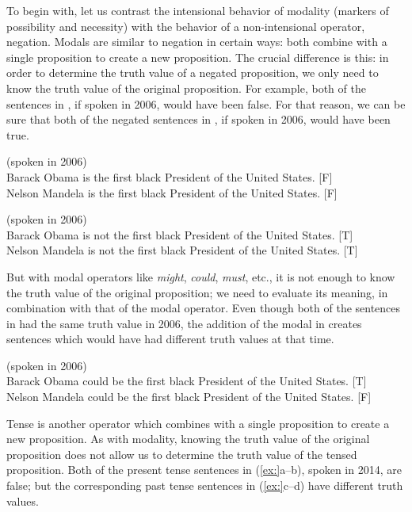 To begin with, let us contrast the intensional behavior of modality (markers of possibility and necessity) with the behavior of a non-intensional operator, negation. Modals are similar to negation in certain ways: both combine with a single proposition to create a new proposition. The crucial difference is this: in order to determine the truth value of a negated proposition, we only need to know the truth value of the original proposition. For example, both of the sentences in , if spoken in 2006, would have been false. For that reason, we can be sure that both of the negated sentences in , if spoken in 2006, would have been true.


\ea
(spoken in 2006)\\
\ea Barack Obama is the first black President of the United States.  [F]\\
\ex Nelson Mandela is the first black President of the United States.  [F]
                       \z
\z

\ea
(spoken in 2006)\\
\ea Barack Obama is not the first black President of the United States.  [T]\\
\ex Nelson Mandela is not the first black President of the United States.  [T]
                       \z
\z


But with modal operators like \textit{might}, \textit{could}, \textit{must}, etc., it is not enough to know the truth value of the original proposition; we need to evaluate its meaning, in combination with that of the modal operator. Even though both of the sentences in  had the same truth value in 2006, the addition of the modal in  creates sentences which would have had different truth values at that time.


\ea
(spoken in 2006)\\
\ea Barack Obama could be the first black President of the United States.  [T]\\
\ex Nelson Mandela could be the first black President of the United States.  [F]
                       \z
\z


Tense is another operator which combines with a single proposition to create a new proposition. As with modality, knowing the truth value of the original proposition does not allow us to determine the truth value of the tensed proposition. Both of the present tense sentences in (\ref{ex:}a--b), spoken in 2014, are false; but the corresponding past tense sentences in (\ref{ex:}c--d) have different truth values.



